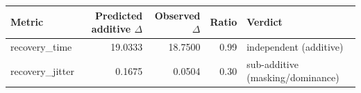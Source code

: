 \begin{tabular}{lrrrl}
\toprule
Metric & Predicted additive $\Delta$ & Observed $\Delta$ & Ratio & Verdict \\
\midrule
recovery\_time & 19.0333 & 18.7500 & 0.99 & independent (additive) \\
recovery\_jitter & 0.1675 & 0.0504 & 0.30 & sub-additive (masking/dominance) \\
\bottomrule
\end{tabular}
